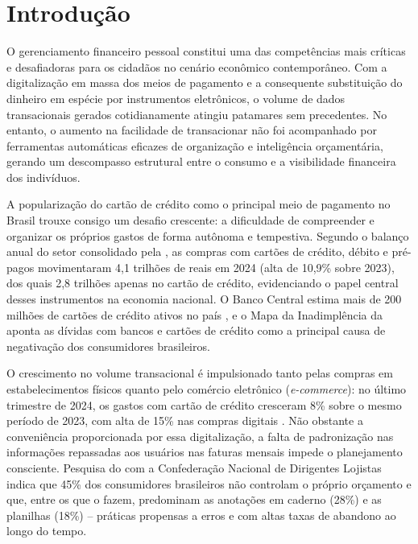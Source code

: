 \chapter{Introdução} \label{Cap:Introdução}

O gerenciamento financeiro pessoal constitui uma das competências mais críticas e desafiadoras para os cidadãos no cenário econômico contemporâneo. Com a digitalização em massa dos meios de pagamento e a consequente substituição do dinheiro em espécie por instrumentos eletrônicos, o volume de dados transacionais gerados cotidianamente atingiu patamares sem precedentes. No entanto, o aumento na facilidade de transacionar não foi acompanhado por ferramentas automáticas eficazes de organização e inteligência orçamentária, gerando um descompasso estrutural entre o consumo e a visibilidade financeira dos indivíduos.

A popularização do cartão de crédito como o principal meio de pagamento no Brasil trouxe consigo um desafio crescente: a dificuldade de compreender e organizar os próprios gastos de forma autônoma e tempestiva. Segundo o balanço anual do setor consolidado pela , as compras com cartões de crédito, débito e pré-pagos movimentaram 4,1 trilhões de reais em 2024 (alta de 10,9\% sobre 2023), dos quais 2,8 trilhões apenas no cartão de crédito, evidenciando o papel central desses instrumentos na economia nacional. O Banco Central estima mais de 200 milhões de cartões de crédito ativos no país \cite{cartacapital2025cartoes}, e o Mapa da Inadimplência da  aponta as dívidas com bancos e cartões de crédito como a principal causa de negativação dos consumidores brasileiros.

O crescimento no volume transacional é impulsionado tanto pelas compras em estabelecimentos físicos quanto pelo comércio eletrônico (\textit{e-commerce}): no último trimestre de 2024, os gastos com cartão de crédito cresceram 8\% sobre o mesmo período de 2023, com alta de 15\% nas compras digitais \cite{poder360_2025}. Não obstante a conveniência proporcionada por essa digitalização, a falta de padronização nas informações repassadas aos usuários nas faturas mensais impede o planejamento consciente. Pesquisa do  com a Confederação Nacional de Dirigentes Lojistas indica que 45\% dos consumidores brasileiros não controlam o próprio orçamento e que, entre os que o fazem, predominam as anotações em caderno (28\%) e as planilhas (18\%) -- práticas propensas a erros e com altas taxas de abandono ao longo do tempo.

